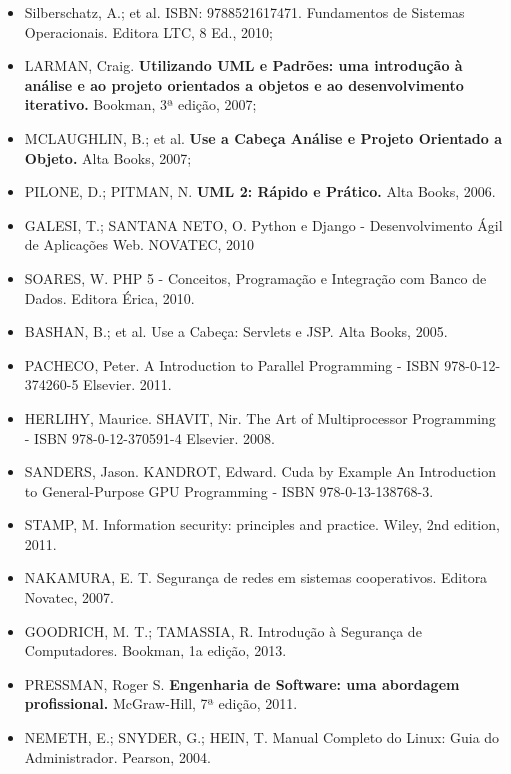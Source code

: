 \begin{itemize}
	\item Silberschatz, A.; et al. ISBN: 9788521617471. Fundamentos de Sistemas Operacionais. Editora LTC, 8 Ed., 2010;
  	\item LARMAN, Craig. \textbf{Utilizando UML e Padrões: uma introdução à análise e ao projeto orientados a objetos e ao desenvolvimento iterativo.} Bookman,  3ª edição, 2007;
	\item MCLAUGHLIN, B.; et al. \textbf{Use a Cabeça Análise e Projeto Orientado a Objeto.} Alta Books, 2007;
	\item PILONE, D.; PITMAN, N. \textbf{UML 2: Rápido e Prático.} Alta Books, 2006.
    \item GALESI, T.; SANTANA NETO, O.
          Python e Django - Desenvolvimento Ágil de Aplicações Web.
          NOVATEC, 2010

    \item SOARES, W.
          PHP 5 - Conceitos, Programação e Integração com Banco de Dados.
          Editora Érica, 2010.
    
    \item BASHAN, B.; et al.
          Use a Cabeça: Servlets e JSP.
          Alta Books, 2005.
	\item PACHECO, Peter. A Introduction to Parallel Programming - ISBN 978-0-12-374260-5 Elsevier. 2011.
	\item HERLIHY, Maurice. SHAVIT, Nir. The Art of Multiprocessor Programming - ISBN 978-0-12-370591-4 Elsevier. 2008.
	\item SANDERS, Jason. KANDROT, Edward. Cuda by Example An Introduction to General-Purpose GPU Programming - ISBN 978-0-13-138768-3.
    \item STAMP, M.
          Information security: principles and practice.
          Wiley, 2nd edition, 2011.

    \item NAKAMURA, E. T.
          Segurança de redes em sistemas cooperativos.
          Editora Novatec, 2007.

    \item GOODRICH, M. T.; TAMASSIA, R.
          Introdução à Segurança de Computadores.
          Bookman, 1a edição, 2013.
	\item PRESSMAN, Roger S. \textbf{Engenharia de Software: uma abordagem profissional.} McGraw-Hill,  7ª edição, 2011.    
    \item NEMETH, E.; SNYDER, G.; HEIN, T.
          Manual Completo do Linux: Guia do Administrador.
          Pearson, 2004.
    

\end{itemize}
